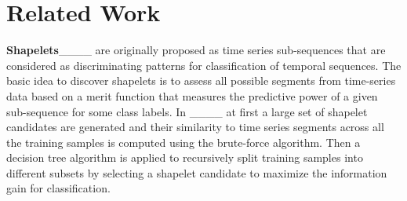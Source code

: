 \section{Related Work}
\label{sec:related-work}


\textbf{Shapelets}____ are originally proposed as time series sub-sequences that are considered as discriminating patterns for classification of temporal sequences.  The basic idea to discover shapelets is to assess all possible segments from time-series data based on a merit function that measures the predictive power of a given sub-sequence for some class labels. In ____ at first a large set of shapelet candidates are generated and their similarity to time series segments across all the training samples is computed using the brute-force algorithm. Then a decision tree algorithm is applied to recursively split training samples into different subsets by selecting a shapelet candidate to maximize the information gain for classification.


